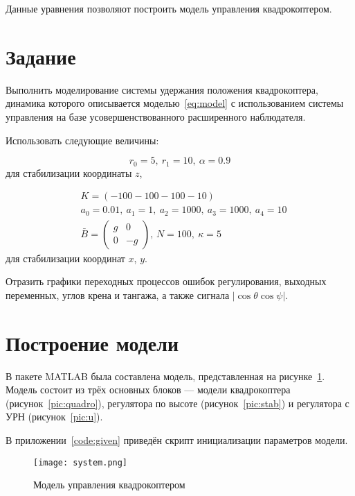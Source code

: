 \documentclass[14pt]{extarticle}
\begin{document}
    Данные уравнения позволяют построить модель управления квадрокоптером.

    \section*{Задание}
    Выполнить моделирование системы удержания положения квадрокоптера, динамика которого описывается моделью~\eqref{eq:model}
    с использованием системы управления на базе усовершенствованного расширенного наблюдателя.

    Использовать следующие величины:

    \begin{equation*}
        r_0 = 5,\ r_1 = 10,\ \alpha = 0.9
    \end{equation*}
    для стабилизации координаты $z$,

    \begin{equation*}
        \begin{aligned}
            & K = \left( -100 -100 -100 -10 \right) \\
            & a_0 = 0.01,\ a_1 = 1,\ a_2 = 1000,\ a_3 = 1000,\ a_4 = 10 \\
            & \bar{B} =
            \begin{pmatrix}
                g & 0 \\
                0 & -g
            \end{pmatrix},\,
            N = 100,\ \kappa = 5
        \end{aligned}
    \end{equation*}
    для стабилизации координат $x$, $y$.

    Отразить графики переходных процессов ошибок регулирования, выходных переменных, углов крена и тангажа, а также
    сигнала $\left|\cos{\theta}\cos{\psi}\right|$.

    \section*{Построение модели}
    В пакете MATLAB была составлена модель, представленная на рисунке~\ref{pic:system}. Модель состоит из трёх основных
    блоков --- модели квадрокоптера (рисунок~\ref{pic:quadro}), регулятора по высоте (рисунок~\ref{pic:stab}) и
    регулятора с УРН (рисунок~\ref{pic:u}).

    В приложении~\ref{code:given} приведён скрипт инициализации параметров модели.

    \begin{figure}[H]
        \centering
        \texttt{[image: system.png]}
        \caption{Модель управления квадрокоптером}
        \label{pic:system}
    \end{figure}
\end{document}
